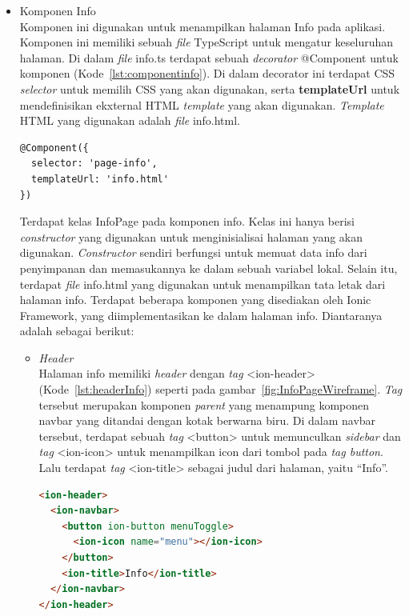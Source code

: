 \begin{itemize}
	\item Komponen Info \\
	Komponen ini digunakan untuk menampilkan halaman Info pada aplikasi. Komponen ini memiliki sebuah \textit{file} TypeScript untuk mengatur keseluruhan halaman. Di dalam \textit{file} info.ts terdapat sebuah \textit{decorator} @Component untuk komponen (Kode~\ref{lst:componentinfo}). Di dalam decorator ini terdapat CSS \textit{selector} untuk memilih CSS yang akan digunakan, serta \textbf{templateUrl} untuk mendefinisikan ekxternal HTML \textit{template} yang akan digunakan. \textit{Template} HTML yang digunakan adalah \textit{file} info.html. 
	
\begin{lstlisting}[language=html, label={lst:componentinfo}, caption=@Component pada info.ts]
@Component({
  selector: 'page-info',
  templateUrl: 'info.html'
})
\end{lstlisting} 

	Terdapat kelas InfoPage pada komponen info. Kelas ini hanya berisi \textit{constructor} yang digunakan untuk menginisialisai halaman yang akan digunakan. \textit{Constructor} sendiri berfungsi untuk memuat data info dari penyimpanan dan memasukannya ke dalam sebuah variabel lokal.
	Selain itu, terdapat \textit{file} info.html yang digunakan untuk menampilkan tata letak dari halaman info. Terdapat beberapa komponen yang disediakan oleh Ionic Framework, yang diimplementasikan ke dalam halaman info. Diantaranya adalah sebagai berikut:
	
	\begin{itemize}
		\item \textit{Header} \\
		Halaman info memiliki \textit{header} dengan \textit{tag} <ion-header> (Kode~\ref{lst:headerInfo}) seperti pada gambar~\ref{fig:InfoPageWireframe}. \textit{Tag} tersebut merupakan komponen \textit{parent} yang menampung komponen navbar yang ditandai dengan kotak berwarna biru. Di dalam navbar tersebut, terdapat sebuah \textit{tag} <button> untuk memunculkan \textit{sidebar} dan \textit{tag} <ion-icon> untuk menampilkan icon dari tombol pada \textit{tag button}. Lalu terdapat \textit{tag} <ion-title> sebagai judul dari halaman, yaitu ``Info''.

\begin{lstlisting}[language=html, label={lst:headerInfo}, caption=\textit{Header} pada info.html]
<ion-header>
  <ion-navbar>
    <button ion-button menuToggle>
      <ion-icon name="menu"></ion-icon>
    </button>
    <ion-title>Info</ion-title>
  </ion-navbar>
</ion-header>
\end{lstlisting} 


\end{itemize}
\end{itemize}
